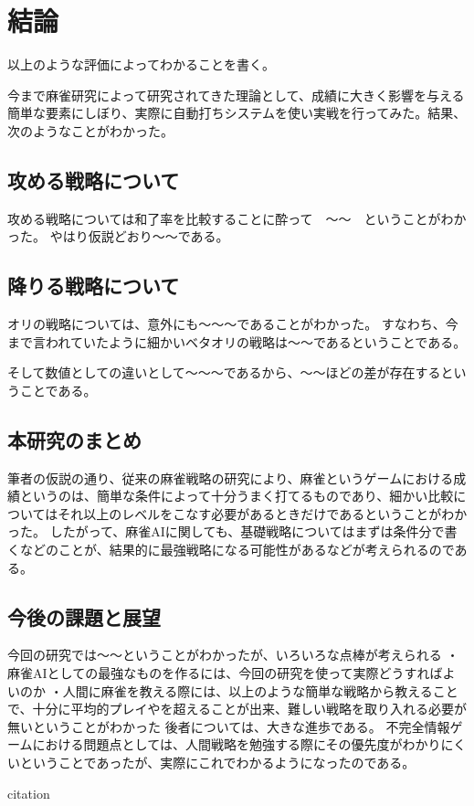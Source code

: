 \chapter{結論}
\label{chap:conclusion}

以上のような評価によってわかることを書く。

今まで麻雀研究によって研究されてきた理論として、成績に大きく影響を与える簡単な要素にしぼり、実際に自動打ちシステムを使い実戦を行ってみた。結果、次のようなことがわかった。

\section{攻める戦略について}

攻める戦略については和了率を比較することに酔って　〜〜　ということがわかった。
やはり仮説どおり〜〜である。

\section{降りる戦略について}

オリの戦略については、意外にも〜〜〜であることがわかった。
すなわち、今まで言われていたように細かいベタオリの戦略は〜〜であるということである。

そして数値としての違いとして〜〜〜であるから、〜〜ほどの差が存在するということである。

\section{本研究のまとめ}

筆者の仮説の通り、従来の麻雀戦略の研究により、麻雀というゲームにおける成績というのは、簡単な条件によって十分うまく打てるものであり、細かい比較についてはそれ以上のレベルをこなす必要があるときだけであるということがわかった。
したがって、麻雀AIに関しても、基礎戦略についてはまずは条件分で書くなどのことが、結果的に最強戦略になる可能性があるなどが考えられるのである。


\section{今後の課題と展望}

今回の研究では〜〜ということがわかったが、いろいろな点棒が考えられる
・麻雀AIとしての最強なものを作るには、今回の研究を使って実際どうすればよいのか
・人間に麻雀を教える際には、以上のような簡単な戦略から教えることで、十分に平均的プレイやを超えることが出来、難しい戦略を取り入れる必要が無いということがわかった
後者については、大きな進歩である。
不完全情報ゲームにおける問題点としては、人間戦略を勉強する際にその優先度がわかりにくいということであったが、実際にこれでわかるようになったのである。

citation\cite{hoge09}




